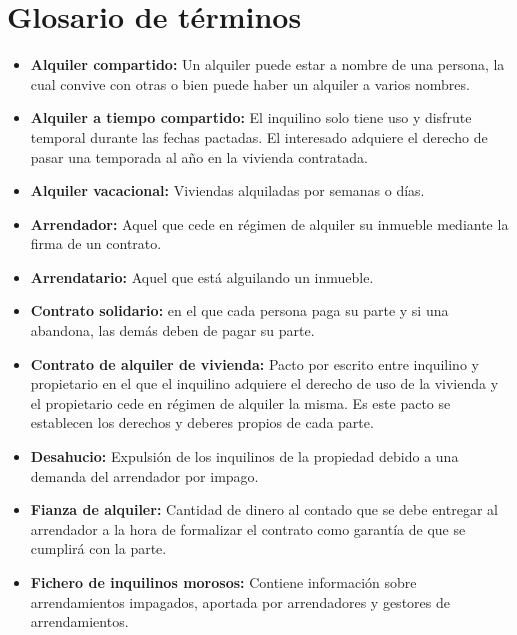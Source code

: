 \chapter{Glosario de términos}

\begin{itemize}

\item \textbf{Alquiler compartido:} Un alquiler puede estar a nombre de una persona, la cual convive con otras o bien puede haber un alquiler a varios nombres. 

\item \textbf{Alquiler a tiempo compartido:} El inquilino solo tiene uso y disfrute temporal durante las fechas pactadas. El interesado adquiere el derecho de pasar una temporada al año en la vivienda contratada.

\item \textbf{Alquiler vacacional:}
Viviendas alquiladas por semanas o días.

\item \textbf{Arrendador:} Aquel que cede en régimen de alquiler su inmueble mediante la firma de un contrato. 

\item \textbf{Arrendatario:} Aquel que está alguilando un inmueble.

\item \textbf{Contrato solidario:} en el que cada persona paga su parte y si una abandona, las demás deben de pagar su parte.

\item \textbf{Contrato de alquiler de vivienda:} Pacto por escrito entre inquilino y propietario en el que el inquilino adquiere el derecho de uso de la vivienda y el propietario cede en régimen de alquiler la misma. Es este pacto se establecen los derechos y deberes propios de cada parte.

\item \textbf{Desahucio:} Expulsión de los inquilinos de la propiedad debido a una demanda del arrendador por impago.

\item \textbf{Fianza de alquiler:} Cantidad de dinero al contado que se debe entregar al arrendador a la hora de formalizar el contrato como garantía de que se cumplirá con la parte.

\item \textbf{Fichero de inquilinos morosos:} Contiene información sobre arrendamientos impagados, aportada por arrendadores y gestores de arrendamientos.


\end{itemize}
